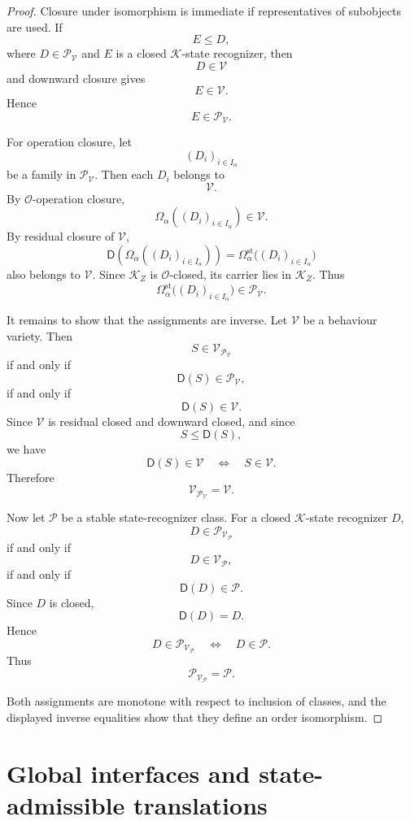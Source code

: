 \begin{proof}
Closure under isomorphism is immediate if representatives of subobjects are
used. If
\[
E\leq D,
\]
where \(D\in\mathcal P_{\mathcal V}\) and \(E\) is a closed
\(\mathcal K\)-state recognizer, then
\[
D\in\mathcal V
\]
and downward closure gives
\[
E\in\mathcal V.
\]
Hence
\[
E\in\mathcal P_{\mathcal V}.
\]

For operation closure, let
\[
(D_i)_{i\in I_\alpha}
\]
be a family in \(\mathcal P_{\mathcal V}\). Then each \(D_i\) belongs to
\[
\mathcal V.
\]
By \(\mathcal O\)-operation closure,
\[
\Omega_\alpha((D_i)_{i\in I_\alpha})\in\mathcal V.
\]
By residual closure of \(\mathcal V\),
\[
\mathsf D(\Omega_\alpha((D_i)_{i\in I_\alpha}))
=
\Omega_\alpha^{\mathrm{st}}
\bigl((D_i)_{i\in I_\alpha}\bigr)
\]
also belongs to \(\mathcal V\). Since \(\mathcal K_Z\) is
\(\mathcal O\)-closed, its carrier lies in \(\mathcal K_Z\). Thus
\[
\Omega_\alpha^{\mathrm{st}}
\bigl((D_i)_{i\in I_\alpha}\bigr)
\in\mathcal P_{\mathcal V}.
\]

It remains to show that the assignments are inverse. Let \(\mathcal V\) be a
behaviour variety. Then
\[
S\in\mathcal V_{\mathcal P_{\mathcal V}}
\]
if and only if
\[
\mathsf D(S)\in\mathcal P_{\mathcal V},
\]
if and only if
\[
\mathsf D(S)\in\mathcal V.
\]
Since \(\mathcal V\) is residual closed and downward closed, and since
\[
S\leq\mathsf D(S),
\]
we have
\[
\mathsf D(S)\in\mathcal V
\quad\Longleftrightarrow\quad
S\in\mathcal V.
\]
Therefore
\[
\mathcal V_{\mathcal P_{\mathcal V}}=\mathcal V.
\]

Now let \(\mathcal P\) be a stable state-recognizer class. For a closed
\(\mathcal K\)-state recognizer \(D\),
\[
D\in\mathcal P_{\mathcal V_{\mathcal P}}
\]
if and only if
\[
D\in\mathcal V_{\mathcal P},
\]
if and only if
\[
\mathsf D(D)\in\mathcal P.
\]
Since \(D\) is closed,
\[
\mathsf D(D)=D.
\]
Hence
\[
D\in\mathcal P_{\mathcal V_{\mathcal P}}
\quad\Longleftrightarrow\quad
D\in\mathcal P.
\]
Thus
\[
\mathcal P_{\mathcal V_{\mathcal P}}=\mathcal P.
\]

Both assignments are monotone with respect to inclusion of classes, and the
displayed inverse equalities show that they define an order isomorphism.
\end{proof}

\section{Global interfaces and state-admissible translations}
\label{sec:state-eilenberg-global-interfaces-state-translations}

